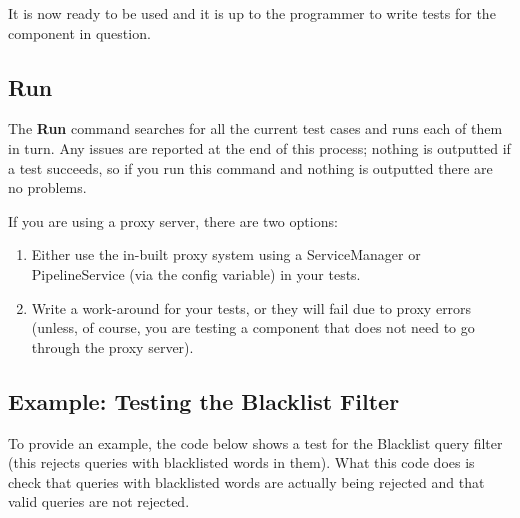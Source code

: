 \documentclass[letterpaper,10pt,english]{sphinxmanual}
\begin{document}
It is now ready to be used and it is up to the programmer to write tests for the component in question.


\subsection{Run}
\label{test-suite:run}
The \textbf{Run} command searches for all the current test cases and runs each of them in turn. Any issues are reported at the end of this process; nothing is outputted if a test succeeds, so if you run this command and nothing is outputted there are no problems.

If you are using a proxy server, there are two options:
\begin{enumerate}
\item {} 
Either use the in-built proxy system using a ServiceManager or PipelineService (via the config variable) in your tests.

\item {} 
Write a work-around for your tests, or they will fail due to proxy errors (unless, of course, you are testing a component that does not need to go through the proxy server).

\end{enumerate}


\subsection{Example: Testing the Blacklist Filter}
\label{test-suite:example-testing-the-blacklist-filter}
To provide an example, the code below shows a test for the Blacklist query filter (this rejects queries with blacklisted words in them). What this code does is check that queries with blacklisted words are actually being rejected and that valid queries are not rejected.
\end{document}
